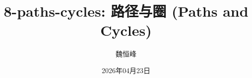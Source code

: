 \documentclass[]{beamer}
\title[8-paths-cycles: 路径与圈]{8-paths-cycles: 路径与圈 (Paths and Cycles)}
\author[魏恒峰]{\large 魏恒峰}
\institute{hfwei@hnu.edu.cn}
\date{2026年04月23日}
\begin{document}
\maketitle





\thankyou{}

\end{document}
